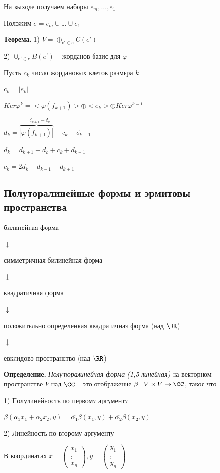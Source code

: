 \bigskip
На выходе получаем наборы $e_m, \dots, e_1$

Положим $e = e_m \cup \dots \cup e_1$

\bigskip
\textbf{Теорема.} 1) $V = \oplus_{e' \in e} C(e')$

2) $\cup_{e' \in e} B(e')$ -- жорданов базис для $\varphi$

\bigskip
Пусть $c_k$ число жордановых клеток размера $k$

$c_k = |e_k|$

$Ker \varphi^k = <\varphi(f_{k+1})> \oplus <e_k> \oplus Ker \varphi^{k-1}$

$d_k = \overbrace{|\varphi(f_{k+1})|}^{= d_{k+1} - d_k} + c_k + d_{k-1}$

$d_k = d_{k+1} - d_k + c_k + d_{k - 1}$

$c_k = 2d_k - d_{k-1} - d_{k+1}$

\subsection{Полуторалинейные формы и эрмитовы пространства}

\bigskip
билинейная форма

$\downarrow$

симметричная билинейная форма

$\downarrow$

квадратичная форма

$\downarrow$

положительно определенная квадратичная форма (над $\RR$)

$\downarrow$

евклидово пространство (над $\RR$)

\bigskip
\textbf{Определение.} \textit{Полуторалинейная форма (1,5-линейная)} на векторном пространстве $V$ над $\CC$ -- это отображение $\beta: V \times V \rightarrow \CC$, такое что

1) Полулинейность по первому аргументу

$\beta(\alpha_1 x_1 + \alpha_2 x_2, y) = \overline{\alpha_1} \beta (x_1, y) + \overline{\alpha_2} \beta (x_2, y)$

2) Линейность по второму аргументу

\bigskip
В координатах $x = \begin{pmatrix} x_1 \\ \vdots \\ x_{n} \end{pmatrix}, y = \begin{pmatrix} y_1 \\ \vdots \\ y_{n} \end{pmatrix}$


